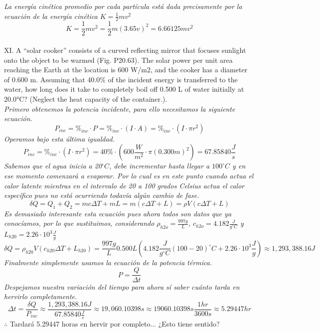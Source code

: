 \documentclass{article}
\newcommand{\cls}{^{\circ}C}
\begin{document}
\textit{La energía cinética promedio por cada partícula está dada precisamente por la ecuación de la energía cinética $K=\frac{1}{2}mv^2$}
\begin{equation*}
    K = \frac{1}{2}mv^2 = \frac{1}{2}m(3.65v)^2 = 6.66125mv^2
\end{equation*}\\
XI. A “solar cooker” consists of a curved reflecting mirror that focuses sunlight onto the object to be warmed (Fig. P20.63). The solar power per unit area reaching the Earth at the location is 600 W/m2, and the cooker has a diameter of 0.600 m. Assuming that 40.0\% of the incident energy is transferred to the water, how long does it take to completely boil off 0.500 L of water initially at 20.0°C? (Neglect the heat capacity of the container.).\\
\textit{Primero obtenemos la potencia incidente, para ello necesitamos la siguiente ecuación.}
\begin{equation}
    P_{inc} = \%_{inc} \cdot P = \%_{inc} \cdot (I \cdot A) = \%_{inc} \cdot (I \cdot \pi r^2)
\end{equation}
\textit{Operamos bajo esta última igualdad.}
\begin{equation*}
    P_{inc} = \%_{inc} \cdot (I \cdot \pi r^2) = 40\% \cdot (600\frac{W}{m^2} \cdot \pi (0.300m)^2) = 67.85840 \frac{J}{s}
\end{equation*}
\textit{Sabemos que el agua inicia a 20$\cls$, debe incrementar hasta llegar a $100\cls$ y en ese momento comenzará a evaporar. Por lo cual es en este punto cuando actua el calor latente mientras en el intervalo de 20 a 100 grados Celsius actua el calor específico pues no está ocurriendo todavía algún cambio de fase.}
\begin{equation}
    \delta Q = Q_1 + Q_2 = mc\Delta T + mL = m(c\Delta T + L) = \rho V(c\Delta T + L)
\end{equation}
\textit{Es demasiado interesante esta ecuación pues ahora todos son datos que ya conocíamos, por lo que sustituimos, considerando $\rho_{h2o}=\frac{997g}{L}$, $c_{h2o}=4.182\frac{J}{g \cls}$ y $L_{h20}= 2.26 \cdot 10^3 \frac{J}{g}$}
\begin{equation*}
    \delta Q = \rho_{h20} V(c_{h20}\Delta T + L_{h20}) = \frac{997g}{L} 0.500L(4.182\frac{J}{g \cls}(100-20)\cls + 2.26 \cdot 10^3 \frac{J}{g}) \approx 1,293,388.16J
\end{equation*}
\textit{Finalmente simplemente usamos la ecuación de la potencia térmica.}
\begin{equation}
    P = \frac{Q}{\Delta t}
\end{equation}
\textit{Despejamos nuestra variación del tiempo para ahora sí saber cuánto tarda en hervirlo completamente.}
$$\Delta t = \frac{\delta Q}{P_{inc}} \approx \frac{1,293,388.16J}{67.85840 \frac{J}{s}} \approx 19,060.10398s \approx 19060.10398s \frac{1hr}{3600s} \approx 5.29447hr $$
$\therefore$ Tardará 5.29447 horas en hervir por completo... ¿Esto tiene sentido?
\end{document}
